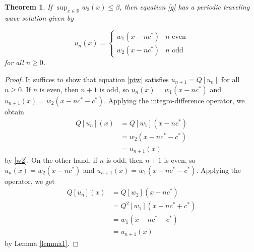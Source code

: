 \documentclass[11pt]{article}
\newtheorem{thm}{Theorem}
\theoremstyle{definition}
\numberwithin{equation}{section}
\numberwithin{thm}{section}
\renewcommand{\b}{\beta}
\begin{document}
\begin{thm} \label{theorem1}
If $\sup_{x\in\mathbb R}w_2(x)\leq \b$, then equation \eqref{q} has a periodic traveling wave solution given by %

\begin{equation} \label{ptw}
u_n(x) = \begin{cases}
w_1(x-nc^*) & n \text{ even} \\
w_2(x-nc^*) & n \text{ odd}
\end{cases}
\end{equation}
for all $n \geq 0$.
\end{thm}

\begin{proof}
It suffices to show that equation \eqref{ptw} satisfies $u_{n+1}=Q[u_n]$ for all $n \geq 0$. If $n$ is even, then $n+1$ is odd, so $u_n(x)=w_1(x-nc^*)$ and $u_{n+1}(x)=w_2(x-nc^*-c^*)$. Applying the integro-difference operator, we obtain
\begin{equation} \begin{aligned}
Q[u_n](x) &= Q[w_1](x-nc^*) \\
&= w_2(x-nc^*-c^*) \\
&= u_{n+1}(x)
\end{aligned} \end{equation}
by \eqref{w2}. On the other hand, if $n$ is odd, then $n+1$ is even, so $u_n(x)=w_2(x-nc^*)$ and $u_{n+1}(x)=w_1(x-nc^*-c^*)$. Applying the operator, we get
\begin{equation} \begin{aligned}
Q[u_n](x) &= Q[w_2](x-nc^*) \\
&= Q^2[w_1](x-nc^*+c^*) \\
&= w_1(x-nc^*-c^*) \\
&= u_{n+1}(x)
\end{aligned} \end{equation}
by Lemma \ref{lemma1}.
\end{proof}
\end{document}
